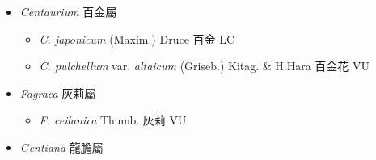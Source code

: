 
  \begin{itemize}
 \item[] \textit{Centaurium} 百金屬
                                
  \begin{itemize}
        \item[] \textit{C. japonicum} (Maxim.) Druce  百金   LC
        \item[] \textit{C. pulchellum} var. \textit{altaicum} (Griseb.) Kitag. \& H.Hara  百金花   VU
  \end{itemize}
 \item[] \textit{Fagraea} 灰莉屬
                                
  \begin{itemize}
        \item[] \textit{F. ceilanica} Thumb.  灰莉   VU
  \end{itemize}
 \item[] \textit{Gentiana} 龍膽屬
                                

\end{itemize}
